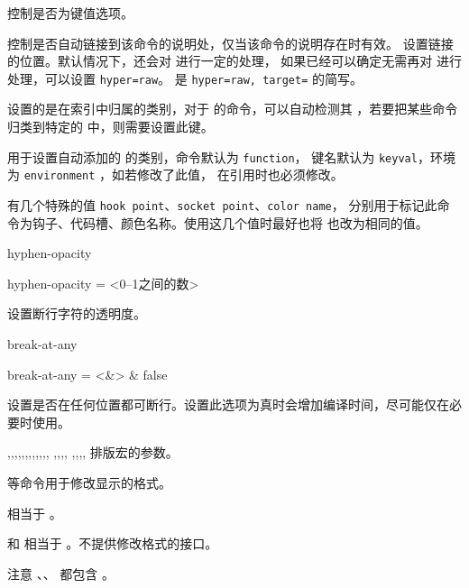 \documentclass{cusdoc}
\begin{document}
 控制是否为键值选项。

 控制是否自动链接到该命令的说明处，仅当该命令的说明存在时有效。
 设置链接的位置。默认情况下，还会对  进行一定的处理，
如果已经可以确定无需再对  进行处理，可以设置 \verb|hyper=raw|。
 是 \verb|hyper=raw, target=| 的简写。

 设置的是在索引中归属的类别，对于 \LaTeXiii 的命令，可以自动检测其 
，若要把某些命令归类到特定的  中，则需要设置此键。

 用于设置自动添加的  的类别，命令默认为 \texttt{function}，
键名默认为 \texttt{keyval}，环境为 \texttt{environment} ，如若修改了此值，
在引用时也必须修改。

 有几个特殊的值 \texttt{hook point}、\texttt{socket point}、\texttt{color name}，
分别用于标记此命令为钩子、代码槽、颜色名称。使用这几个值时最好也将  也改为相同的值。

\begin{keyval}[path=doc/cmd]{hyphen-opacity}
  \begin{syntax}
    hyphen-opacity = <{0--1之间的数}>
  \end{syntax}
设置断行字符的透明度。
\end{keyval}

\begin{keyval}[path=doc/cmd]{break-at-any}
  \begin{syntax}
    break-at-any = <&\TTF> & false 
  \end{syntax}
设置是否在任何位置都可断行。设置此选项为真时会增加编译时间，尽可能仅在必要时使用。
\end{keyval}

\begin{function}{\meta,\veta,\marg,\Arg,\oarg,\parg,\pkg,\env,\cls,\opt,\file,\docfile,
  \cus@doc@meta@format,\cus@doc@veta@format,\cus@doc@marg@format,\cus@doc@oarg@format,
  \cus@doc@parg@format,\cus@doc@pkg@format,\cus@doc@env@format,\cus@doc@cls@format,\cus@doc@opt@format} 
排版宏的参数。

 等命令用于修改显示的格式。

 相当于 。

 和  相当于 。不提供修改格式的接口。

注意 、、 都包含 。
\end{function}
\end{document}

